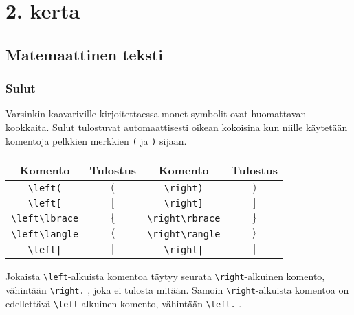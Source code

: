 \section{2. kerta}


\subsection{Matemaattinen teksti}
\begin{fframe}
    \frametitle{Sulut}
    Varsinkin kaavariville kirjoitettaessa monet symbolit ovat huomattavan kookkaita. Sulut tulostuvat automaattisesti oikean kokoisina kun niille käytetään komentoja pelkkien merkkien \lstinline-(- ja \lstinline-)- sijaan. \vaihto
    \begin{tabular}{cc|cc}
        Komento & Tulostus & Komento & Tulostus\\
        \hline
        \lstinline-\left(- & \(\left(\right.\) & \lstinline-\right)-& \(\left.\right)\)\\
        \lstinline-\left[- & \(\left[\right.\) & \lstinline-\right]-& \(\left.\right]\)\\
        \lstinline-\left\lbrace- & \(\left\lbrace\right.\) & \lstinline-\right\rbrace- & \(\left.\right\rbrace\)\\
        \lstinline-\left\langle- & \(\left\langle\right.\) & \lstinline-\right\rangle- & \(\left.\right\rangle\)\\
        \lstinline-\left|- & \(\left|\right.\) & \lstinline-\right|- & \(\left.\right|\)\\
    \end{tabular}
    \vaihto
    Jokaista \lstinline-\left--alkuista komentoa täytyy seurata \lstinline-\right--alkuinen komento, vähintään \lstinline-\right.- , joka ei tulosta mitään. Samoin \lstinline-\right--alkuista komentoa on edellettävä \lstinline-\left--alkuinen komento, vähintään \lstinline-\left.- . 
\end{fframe}

